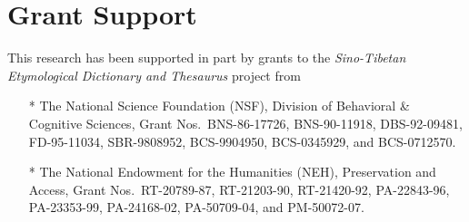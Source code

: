 \chapter*{Grant Support}
\thispagestyle{empty}

This research has been supported
in part by grants to the \textit{Sino-Tibetan
Etymological Dictionary and Thesaurus} project from

\begin{itemize}
\item[*] The National Science Foundation (NSF), Division of
  Behavioral \& Cognitive Sciences, Grant Nos.\ BNS-86-17726,
  BNS-90-11918, DBS-92-09481, FD-95-11034, SBR-9808952,
  BCS-9904950, BCS-0345929, and BCS-0712570.
\item[*] The National Endowment for the Humanities (NEH),
  Preservation and Access, Grant Nos.\ RT-20789-87, RT-21203-90,
  RT-21420-92, PA-22843-96, PA-23353-99, PA-24168-02,
  PA-50709-04, and PM-50072-07.
\end{itemize}


\cleartooddpage